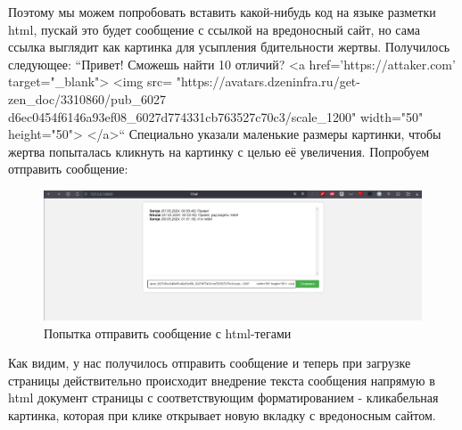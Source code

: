 \documentclass[a4paper,12pt]{diplom}
\begin{document}
	 Поэтому мы можем попробовать вставить какой-нибудь код на языке разметки html, пускай это будет сообщение с ссылкой на вредоносный сайт, но сама ссылка выглядит как картинка для усыпления бдительности жертвы. Получилось следующее:
	 ``Привет! Сможешь найти 10 отличий? <a href='https://attaker.com' target="\_blank">
	 <img src=
	 "https://avatars.dzeninfra.ru/get-zen\_doc/3310860/pub\_6027 \linebreak d6ec0454f6146a93ef08\_6027d774331cb763527c70c3/scale\_1200"
	 width="50" height="50">
	 </a>``
	 Специально указали маленькие размеры картинки, чтобы жертва попыталась кликнуть на картинку с целью её увеличения. Попробуем отправить сообщение:
	 
	 \begin{figure}[!ht]
	 	{\centering
	 	\includegraphics[width=1\textwidth]{chat_xss_attack_success.png}
	 	\caption{Попытка отправить сообщение с html-тегами}
	 	\label{fig:chat_xss_attack_success}
	 }
	\end{figure}
	 Как видим, у нас получилось отправить сообщение и теперь при загрузке страницы действительно происходит внедрение текста сообщения напрямую в html документ страницы с соответствующим форматированием - кликабельная картинка, которая при клике открывает новую вкладку с вредоносным сайтом.
\end{document}
